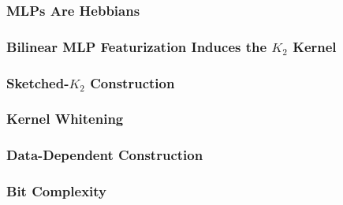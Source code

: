 \subsubsection{MLPs Are Hebbians}
\label{app:theory:hebbian_mlps:setup}


\subsubsection{Bilinear MLP Featurization Induces the $K_{2}$ Kernel}
\label{app:theory:hebbian_mlps:mlp_kernels}


\subsubsection{Sketched-$K_{2}$ Construction}
\label{app:hebbian-mlps-construction}


\subsubsection{Kernel Whitening}
\label{app:theory:margin_bounds:kernel_whitening}


\subsubsection{Data-Dependent Construction}
\label{app:theory:margin_bounds:data_dependent_construction}


\subsubsection{Bit Complexity}
\label{app:theory:margin_bounds:bit_complexity}

